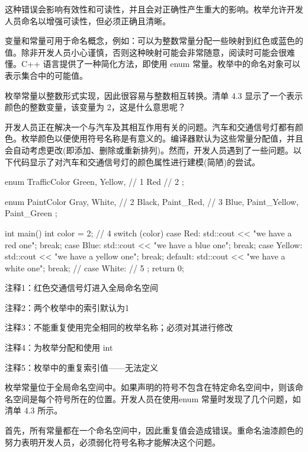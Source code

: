 这种错误会影响有效性和可读性，并且会对正确性产生重大的影响。枚举允许开发人员命名以增强可读性，但必须正确且清晰。


变量和常量可用于命名概念，例如：可以为整数常量分配一些映射到红色或蓝色的值。除非开发人员小心谨慎，否则这种映射可能会非常随意，阅读时可能会很难懂。C++ 语言提供了一种简化方法，即使用 enum 常量。枚举中的命名对象可以表示集合中的可能值。

枚举常量以整数形式实现，因此很容易与整数相互转换。清单 4.3 显示了一个表示颜色的整数变量，该变量为 2，这是什么意思呢？

开发人员正在解决一个与汽车及其相互作用有关的问题。汽车和交通信号灯都有颜色。枚举颜色以便使用符号名称是有意义的。编译器默认为这些常量分配值，并且会自动考虑更改(即添加、删除或重新排列)。然而，开发人员遇到了一些问题。以下代码显示了对汽车和交通信号灯的颜色属性进行建模(简陋)的尝试。


\begin{cpp}
enum TrafficColor {
  Green,
  Yellow, // 1
  Red // 2
};

enum PaintColor {
  Gray,
  White, // 2
  Black,
  Paint_Red, // 3
  Blue,
  Paint_Yellow,
  Paint_Green
};

int main() {
  int color = 2; // 4
  switch (color) {
  case Red:
    std::cout << "we have a red one\n";
    break;
  case Blue:
    std::cout << "we have a blue one\n";
    break;
  case Yellow:
    std::cout << "we have a yellow one\n";
    break;
  default:
    std::cout << "we have a white one\n";
    break;
  // case White: // 5
  };
  return 0;
}
\end{cpp}

{\footnotesize
注释1：红色交通信号灯进入全局命名空间

注释2：两个枚举中的索引默认为1

注释3：不能重复使用完全相同的枚举名称；必须对其进行修改

注释4：为枚举分配和使用 int

注释5：枚举中的重复索引值——无法定义
}


枚举常量位于全局命名空间中。如果声明的符号不包含在特定命名空间中，则该命名空间是每个符号所在的位置。开发人员在使用enum 常量时发现了几个问题，如清单 4.3 所示。

首先，所有常量都在一个命名空间中，因此重复值会造成错误。重命名油漆颜色的努力表明开发人员，必须弱化符号名称才能解决这个问题。

